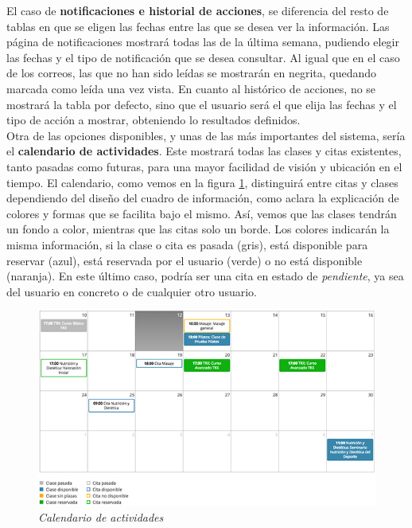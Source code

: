 El caso de \textbf{notificaciones e historial de acciones}, se diferencia del resto de tablas en que se eligen las fechas entre las que se desea ver la información. Las página de notificaciones mostrará todas las de la última semana, pudiendo elegir las fechas y el tipo de notificación que se desea consultar. Al igual que en el caso de los correos, las que no han sido leídas se mostrarán en negrita, quedando marcada como leída una vez vista. En cuanto al histórico de acciones, no se mostrará la tabla por defecto, sino que el usuario será el que elija las fechas y el tipo de acción a mostrar, obteniendo lo resultados definidos. \\

Otra de las opciones disponibles, y unas de las más importantes del sistema, sería el \textbf{calendario de actividades}. Este mostrará todas las clases y citas existentes, tanto pasadas como futuras, para una mayor facilidad de visión y ubicación en el tiempo. El calendario, como vemos en la figura \ref{fig:calendario}, distinguirá entre citas y clases dependiendo del diseño del cuadro de información, como aclara la explicación de colores y formas que se facilita bajo el mismo. Así, vemos que las clases tendrán un fondo a color, mientras que las citas solo un borde. Los colores indicarán la misma información, si la clase o cita es pasada (gris), está disponible para reservar (azul), está reservada por el usuario (verde) o no está disponible (naranja). En este último caso, podría ser una cita en estado de \textit{pendiente}, ya sea del usuario en concreto o de cualquier otro usuario. \\

\begin{figure}
\centering
  \includegraphics[scale=.60]{img/manual/calendario.jpg}
  \caption{\textit{Calendario de actividades}}
  \label{fig:calendario}
\end{figure}

